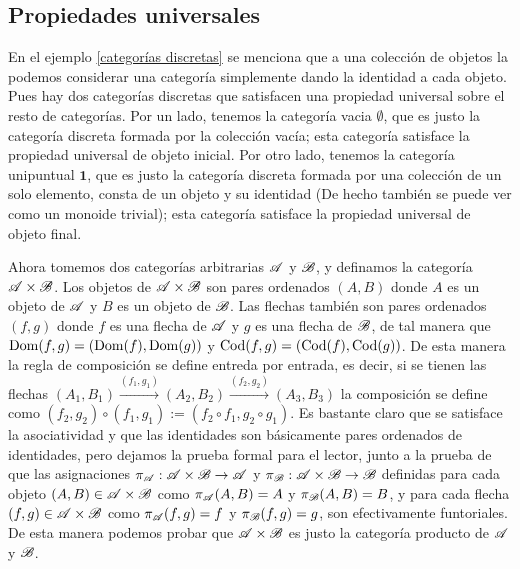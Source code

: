 \documentclass{comunicaciones}
\begin{document}
\subsection{Propiedades universales}

En el ejemplo \ref{categorías discretas} se menciona que a una colección de objetos la podemos considerar una categoría simplemente dando la identidad a cada objeto.
Pues hay dos categorías discretas que satisfacen una propiedad universal sobre el resto de categorías. Por un lado, tenemos la categoría vacia $\mathbb{\emptyset}$, que es
justo la categoría discreta formada por la colección vacía; esta categoría satisface la propiedad universal de objeto inicial. Por otro lado, tenemos la categoría
unipuntual $\mathbf{1}$, que es justo la categoría discreta formada por una colección de un solo elemento, consta de un objeto y su identidad (De hecho también 
se puede ver como un monoide trivial); esta categoría satisface la propiedad universal de objeto final.

Ahora tomemos dos categorías arbitrarias $\mathscr A$ y $\mathscr B$, y definamos la categoría $\mathscr A\times\mathscr B$. Los objetos de $\mathscr A\times\mathscr B$ son pares ordenados $(A,B)$ donde $A$
es un objeto de $\mathscr A$ y $B$ es un objeto de $\mathscr B$. Las flechas también son pares ordenados $(f,g)$ donde $f$ es una flecha de $\mathscr A$ y $g$ es una flecha de $\mathscr B$,
de tal manera que $\mathrm{Dom}(f,g)=(\mathrm{Dom}(f),\mathrm{Dom}(g))$ y $\mathrm{Cod}(f,g)=(\mathrm{Cod}(f),\mathrm{Cod}(g))$. De esta manera la regla de composición se define entreda por entrada, es decir,
si se tienen las flechas $(A_1,B_1)\xrightarrow{(f_1,g_1)}(A_2,B_2)\xrightarrow{(f_2,g_2)}(A_3,B_3)$ la composición se define como $(f_2,g_2)\circ(f_1,g_1)
:=(f_2\circ f_1,g_2\circ g_1)$. Es bastante claro que se satisface la asociatividad y que las identidades son básicamente pares ordenados de identidades, pero
dejamos la prueba formal para el lector, junto a la prueba de que las asignaciones $\pi_\mathscr A:\mathscr A\times\mathscr B\to\mathscr A$ y $\pi_\mathscr B:\mathscr A\times\mathscr B\to\mathscr B$ definidas para cada objeto
$(A,B)\in\mathscr A\times\mathscr B$ como $\pi_\mathscr A(A,B)=A$ y $\pi_\mathscr B(A,B)=B$, y para cada flecha $(f,g)\in\mathscr A\times\mathscr B$ como $\pi_\mathscr A(f,g)=f$ y $\pi_\mathscr B(f,g)=g$, son efectivamente 
funtoriales. De esta manera podemos probar que $\mathscr A\times\mathscr B$ es justo la categoría producto de $\mathscr A$ y $\mathscr B$.
\end{document}

